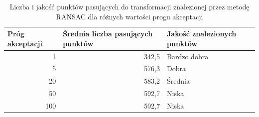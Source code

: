 \documentclass{article}
\begin{document}
	\begin{table}[H]
		\centering
		\caption{Liczba i jakość punktów pasujących do transformacji znalezionej przez metodę RANSAC dla różnych wartości progu akceptacji}
		\label{tab:thresh}
		\begin{tabular}{|r|r|l|}
			\hline
			\multicolumn{1}{|l|}{\textbf{Próg akceptacji}} & \multicolumn{1}{l|}{\textbf{Średnia liczba pasujących punktów}} & \textbf{Jakość znalezionych punktów} \\ \hline
			1                                              & 342,5                                                           & Bardzo dobra                         \\ \hline
			5                                              & 576,3                                                           & Dobra                                \\ \hline
			20                                             & 583,2                                                           & Średnia                              \\ \hline
			50                                             & 592,7                                                           & Niska                                \\ \hline
			100                                            & 592,7                                                           & Niska                                \\ \hline
		\end{tabular}
	\end{table}
\end{document}

